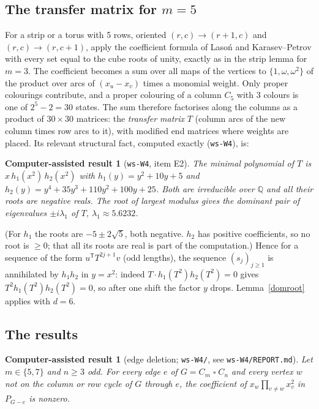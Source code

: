 \documentclass[11pt]{article}
\theoremstyle{plain}
\newtheorem{computed}[theorem]{Computer-assisted result}
\theoremstyle{definition}
\theoremstyle{remark}
\newcommand{\T}{\mathbin{\square}}
\newcommand{\Q}{\mathbb{Q}}
\newcommand{\script}[1]{\texttt{#1}}
\begin{document}
\subsection{The transfer matrix for $m = 5$}

For a strip or a torus with 5 rows, oriented $(r,c) \to (r+1,c)$ and $(r,c) \to (r,c+1)$, apply the coefficient formula
of Laso\'n and Karasev--Petrov \cite{Lason,KP} with every set equal to the cube roots of unity, exactly as in the strip
lemma for $m = 3$. The coefficient becomes a sum over all maps of the vertices to $\{1, \omega, \omega^2\}$ of the product
over arcs of $(x_u - x_v)$ times a monomial weight. Only proper colourings contribute, and a proper colouring of a column
$C_5$ with 3 colours is one of $2^5 - 2 = 30$ states. The sum therefore factorises along the columns as a product of
$30 \times 30$ matrices: the \emph{transfer matrix} $T$ (column arcs of the new column times row arcs to it), with
modified end matrices where weights are placed. Its relevant structural fact, computed exactly
(\script{ws-W4}), is:

\begin{computed}[\script{ws-W4}, item E2]\label{minpoly}
The minimal polynomial of $T$ is $x\, h_1(x^2)\, h_2(x^2)$ with
$h_1(y) = y^2 + 10y + 5$ and $h_2(y) = y^4 + 35y^3 + 110y^2 + 100y + 25$. Both are irreducible over $\Q$ and all their
roots are negative reals. The root of largest modulus gives the dominant pair of eigenvalues $\pm i\lambda_1$ of $T$,
$\lambda_1 \approx 5.6232$.
\end{computed}

(For $h_1$ the roots are $-5 \pm 2\sqrt5$, both negative. $h_2$ has positive coefficients, so no root is $\ge 0$; that
all its roots are real is part of the computation.) Hence for a sequence of the form $u^{\mathsf T} T^{2j+1} v$ (odd
lengths), the sequence $(s_j)_{j \ge 1}$ is annihilated by $h_1 h_2$ in $y = x^2$: indeed
$T \cdot h_1(T^2) h_2(T^2) = 0$ gives $T^{2} h_1(T^2) h_2(T^2) = 0$, so after one shift the factor $y$ drops. Lemma~\ref{domroot}
applies with $d = 6$.

\subsection{The results}

\begin{computed}[edge deletion; \script{ws-W4/}, see \script{ws-W4/REPORT.md}]\label{edgedel}
Let $m \in \{5, 7\}$ and $n \ge 3$ odd. For every edge $e$ of $G = C_m \T C_n$ and every vertex $w$ not on the column or row
cycle of $G$ through $e$, the coefficient of $x_w \prod_{v \ne w} x_v^2$ in $P_{G - e}$ is nonzero.
\end{computed}
\end{document}
